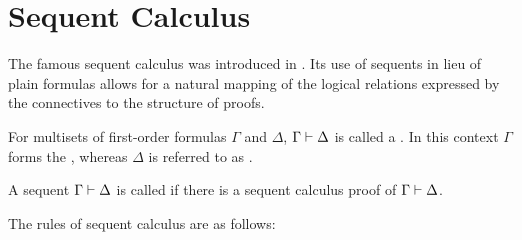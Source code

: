 \section{Sequent Calculus}
\label{sec:lk}

The famous sequent calculus was introduced in \cite{Gentzen}.
Its use of sequents in lieu of plain formulas allows for a natural mapping of the logical relations expressed by the connectives to the structure of proofs.

\begin{defi} 
	For multisets of first-order formulas $\Gamma$ and $\Delta$,  $\Gamma \vdash \Delta$ is called a . 
	In this context $\Gamma$ forms the , whereas $\Delta$ is referred to as .

	A sequent $\Gamma \vdash \Delta$ is called  if there is a sequent calculus proof of $\Gamma \proves\nolinebreak \Delta$.
\end{defi}

The rules of sequent calculus are as follows:


